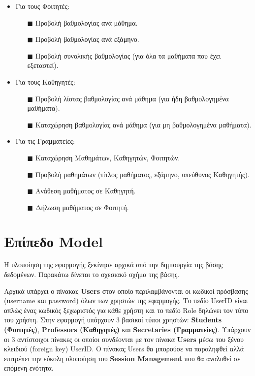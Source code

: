 \documentclass[12pt]{article}
\begin{document}
	\begin{itemize}
		
		\item Για τους Φοιτητές:
		\begin{itemize}
			\item[$\blacksquare$] Προβολή βαθμολογίας ανά μάθημα.
			\item[$\blacksquare$] Προβολή βαθμολογίας ανά εξάμηνο.
			\item[$\blacksquare$] Προβολή συνολικής βαθμολογίας (για όλα τα μαθήματα που έχει εξεταστεί).
		\end{itemize}
	
		\item Για τους Καθηγητές:
		\begin{itemize}
			\item[$\blacksquare$] Προβολή λίστας βαθμολογίας ανά μάθημα (για ήδη βαθμολογημένα μαθήματα).
			\item[$\blacksquare$] Καταχώρηση βαθμολογίας ανά μάθημα (για μη βαθμολογημένα μαθήματα).
		\end{itemize}
	
		\item Για τις Γραμματείες:
		\begin{itemize}
			\item[$\blacksquare$] Καταχώρηση Μαθημάτων, Καθηγητών, Φοιτητών.
			\item[$\blacksquare$] Προβολή μαθημάτων (τίτλος μαθήματος, εξάμηνο, υπεύθυνος Καθηγητής).
			\item[$\blacksquare$] Ανάθεση μαθήματος σε Καθηγητή.
			\item[$\blacksquare$] Δήλωση μαθήματος σε Φοιτητή.
		\end{itemize}
	
	\end{itemize}
	
	\section{Επίπεδο Model}
	Η υλοποίηση της εφαρμογής ξεκίνησε αρχικά από την δημιουργία της βάσης δεδομένων. Παρακάτω δίνεται το σχεσιακό σχήμα της βάσης.
	
	Αρχικά υπάρχει ο πίνακας \textbf{Users} στον οποίο περιλαμβάνονται οι κωδικοί πρόσβασης (username και password) όλων των χρηστών της εφαρμογής. Το πεδίο UserID είναι απλώς ένας κωδικός ξεχωριστός για κάθε χρήστη και το πεδίο Role δηλώνει τον τύπο του χρήστη. Στην εφαρμογή υπάρχουν 3 βασικοί τύποι χρηστών: \textbf{Students (Φοιτητές)}, \textbf{Professors (Καθηγητές)} και \textbf{Secretaries (Γραμματείες)}. Υπάρχουν οι 3 αντίστοιχοι πίνακες οι οποίοι συνδέονται με τον πίνακα \textbf{Users} μέσω του ξένου κλειδιού (foreign key) UserID. Ο πίνακας Users θα μπορούσε να παραληφθεί αλλά επιτρέπει την εύκολη υλοποίηση του \textbf{Session Management} που θα αναλυθεί σε επόμενη ενότητα.
	
\end{document}
